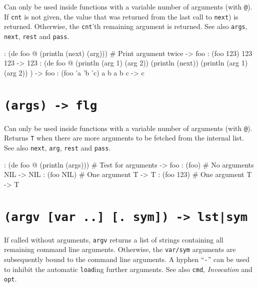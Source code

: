 Can only be used inside functions with a variable number of arguments
(with \texttt{@}). If \texttt{cnt} is not given, the value that was returned from the
last call to \texttt{next}) is returned. Otherwise, the \texttt{cnt}'th remaining
argument is returned. See also \texttt{args}, \texttt{next}, \texttt{rest} and \texttt{pass}.


\begin{wideverbatim}
: (de foo @ (println (next) (arg)))    # Print argument twice
-> foo
: (foo 123)
123 123
-> 123
: (de foo @
   (println (arg 1) (arg 2))
   (println (next))
   (println (arg 1) (arg 2)) )
-> foo
: (foo 'a 'b 'c)
a b
a
b c
-> c
\end{wideverbatim}

 
\section*{\texttt{(args) -> flg}}
\label{sec:func-ref-A-(args) -> flg}


Can only be used inside functions with a variable number of arguments
(with \texttt{@}). Returns \texttt{T} when there are more arguments to be fetched from
the internal list. See also \texttt{next}, \texttt{arg}, \texttt{rest} and \texttt{pass}.


\begin{wideverbatim}
: (de foo @ (println (args)))       # Test for arguments
-> foo
: (foo)                             # No arguments
NIL
-> NIL
: (foo NIL)                         # One argument
T
-> T
: (foo 123)                         # One argument
T
-> T
\end{wideverbatim}

 
\section*{\texttt{(argv [var ..] [. sym]) -> lst|sym}}
\label{sec:func-ref-A-(argv [var ..] [. sym]) -> lst|sym}


If called without arguments, \texttt{argv} returns a list of strings
containing all remaining command line arguments. Otherwise, the
\texttt{var/sym} arguments are subsequently bound to the command line
arguments. A hyphen ``\texttt{-}'' can be used to inhibit the
automatic \texttt{load}ing further arguments. See also \texttt{cmd},
\emph{Invocation} and \texttt{opt}.



